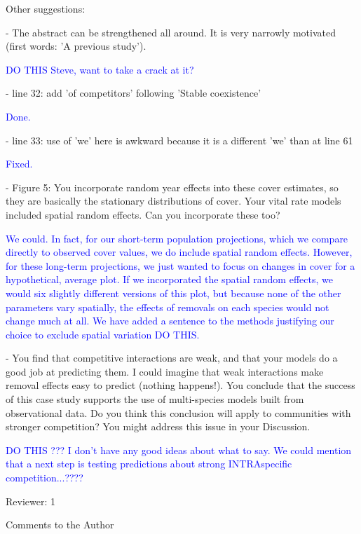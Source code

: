 \documentclass[12pt]{article}
\newcommand{\response}{\textcolor{blue}}
\begin{document}
Other suggestions:

- The abstract can be strengthened all around. It is very narrowly motivated (first words: 'A previous study').

\response{DO THIS Steve, want to take a crack at it?}

- line 32: add 'of competitors' following 'Stable coexistence'

\response{Done.}

- line 33: use of 'we' here is awkward because it is a different 'we' than at line 61

\response{Fixed.}

- Figure 5: You incorporate random year effects into these cover estimates, so they are basically the stationary distributions of cover. Your vital rate models included spatial random effects. Can you incorporate these too?

\response{We could. In fact, for our short-term population projections, which we compare directly to observed cover values, we do include spatial random effects. However, for these long-term projections, we just wanted to focus on changes in cover for a hypothetical, average plot. If we incorporated the spatial random effects, we would six slightly different versions of this plot, but because none of the other parameters vary spatially, the effects of removals on each species would not change much at all. We have added a sentence to the methods justifying our choice to exclude spatial variation DO THIS. }

- You find that competitive interactions are weak, and that your models do a good job at predicting them. I could imagine that weak interactions make removal effects easy to predict (nothing happens!). You conclude that the success of this case study supports the use of multi-species models built from observational data. Do you think this conclusion will apply to communities with stronger competition? You might address this issue in your Discussion.

\response{DO THIS ??? I don't have any good ideas about what to say. We could mention that a next step is testing predictions about strong INTRAspecific competition...????  }

Reviewer: 1

Comments to the Author
\end{document}
